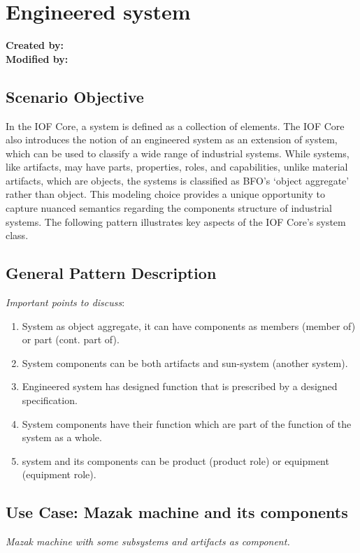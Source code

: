 
\section{Engineered system}
\label{chapter-scenario-template}

\textbf{Created by:}  \\
\textbf{Modified by:}  \\

\subsection*{Scenario Objective}
In the IOF Core, a system is defined as a collection of elements. The IOF Core also introduces the notion of an engineered system as an extension of system, which can be used to classify a wide range of industrial systems. While systems, like artifacts, may have parts, properties, roles, and capabilities, unlike material artifacts, which are objects, the systems is classified as BFO’s `object aggregate' rather than object. This modeling choice provides a unique opportunity to capture nuanced semantics regarding the components structure of industrial systems. The following pattern illustrates key aspects of the IOF Core’s system class.

\subsection*{General Pattern Description}

\textit{Important points to discuss}:

\begin{enumerate}
    \item System as object aggregate, it can have components as members (member of) or part (cont. part of).
    \item System components can be both artifacts and sun-system (another system).
    \item Engineered system has designed function that is prescribed by a designed specification.  
    \item System components have their function which are part of the function of the system as a whole.
    \item system and its components can be product (product role) or equipment (equipment role).
\end{enumerate}


\subsection*{Use Case: Mazak machine and its components}
 \textit{Mazak machine with some subsystems and artifacts as component.}

